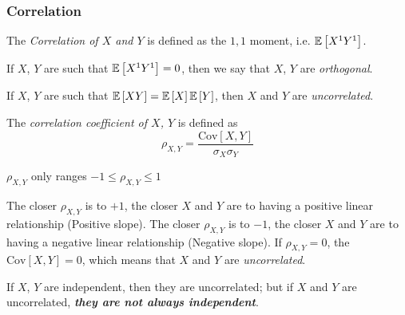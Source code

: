 		\subsubsection{Correlation} \label{subsubsec:Correlation}
			\begin{definition}[Correlation] \label{def:Correlation}
				The \emph{Correlation of $X$ and $Y$} is defined as the $1,1$ moment, i.e. $\operatorname{\operatorname{\mathbb{E}}} \left[ X^{1} Y^{1} \right]$.
				\begin{remark}
					If $X$, $Y$ are such that $\operatorname{\operatorname{\mathbb{E}}} \left[ X^{1} Y^{1} \right] = 0$, then we say that $X$, $Y$ are \emph{orthogonal}.
				\end{remark}
				\begin{remark} \label{rmk:Uncorrelated}
					If $X$, $Y$ are such that $\operatorname{\operatorname{\mathbb{E}}} \left[ XY \right] = \operatorname{\operatorname{\mathbb{E}}} \left[ X \right] \operatorname{\operatorname{\mathbb{E}}} \left[ Y \right]$, then $X$ and $Y$ are \emph{uncorrelated}.
				\end{remark}
			\end{definition}
			\begin{definition} \label{def:Correlation Coefficient}
				The \emph{correlation coefficient of $X$, $Y$} is defined as
				\begin{equation} \label{eq:Correlation Coefficient}
				\rho_{X,Y} = \frac{\text{Cov} \left[ X,Y \right]}{\sigma_{X} \sigma_{Y}}
				\end{equation}
				\begin{remark}
					$\rho_{X,Y}$ only ranges $-1 \leq \rho_{X,Y} \leq 1$
				\end{remark}
				\begin{remark}
					The closer $\rho_{X,Y}$ is to $+1$, the closer $X$ and $Y$ are to having a positive linear relationship (Positive slope). \newline
					The closer $\rho_{X,Y}$ is to $-1$, the closer $X$ and $Y$ are to having a negative linear relationship (Negative slope). \newline
					If $\rho_{X,Y} = 0$, the $\text{Cov}\left[ X,Y \right] = 0$, which means that $X$ and $Y$ are \emph{uncorrelated}.
				\end{remark}
				\begin{remark}
					If $X$, $Y$ are independent, then they are uncorrelated; but if $X$ and $Y$ are uncorrelated, \emph{\textbf{they are not always independent}}.
				\end{remark}
			\end{definition}
		
